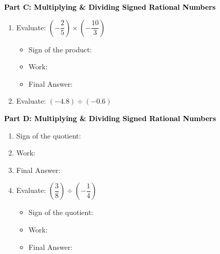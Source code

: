 \documentclass[12pt, letterpaper, fleqn]{article}
\newcommand{\blank}{\underline{\hspace{2.2cm}}}
\newcommand{\blankshorter}{\underline{\hspace{1.5cm}}}
\begin{document}
\newpage

\begin{tcolorbox}[colback=customteal!20]
\large\textcolor{black}{\textbf{Part C: Multiplying \& Dividing Signed Rational Numbers}}
\end{tcolorbox}

\vspace{3mm}

\begin{enumerate}[itemsep=2.2cm, leftmargin=0.6cm, resume]
\begin{itemize}
\item Final Answer: \blank
\end{itemize}
\item Evaluate: $\left(-\dfrac{2}{5}\right) \times \left(-\dfrac{10}{3}\right)$
\vspace{0.5cm}
\begin{itemize}
\item Sign of the product: \blankshorter
\item Work:
    \vspace{1.5cm}
\item Final Answer: \blank
\end{itemize}
\item Evaluate: $(-4.8) \div (-0.6)$
\vspace{0.5cm}
\end{enumerate}

\newpage

\begin{tcolorbox}[colback=customteal!20]
\large\textcolor{black}{\textbf{Part D: Multiplying \& Dividing Signed Rational Numbers}}
\end{tcolorbox}

\vspace{3mm}

\begin{enumerate}[itemsep=2.2cm, leftmargin=0.6cm, resume]
\item Sign of the quotient: \blankshorter
\item Work:
    \vspace{1.5cm}
\item Final Answer: \blank
\item Evaluate: $\left(\dfrac{3}{8}\right) \div \left(-\dfrac{1}{4}\right)$
\vspace{0.5cm}
\begin{itemize}
\item Sign of the quotient: \blankshorter
\item Work:
    \vspace{1.5cm}
\item Final Answer: \blank
\end{itemize}
\end{enumerate}
\end{document}
